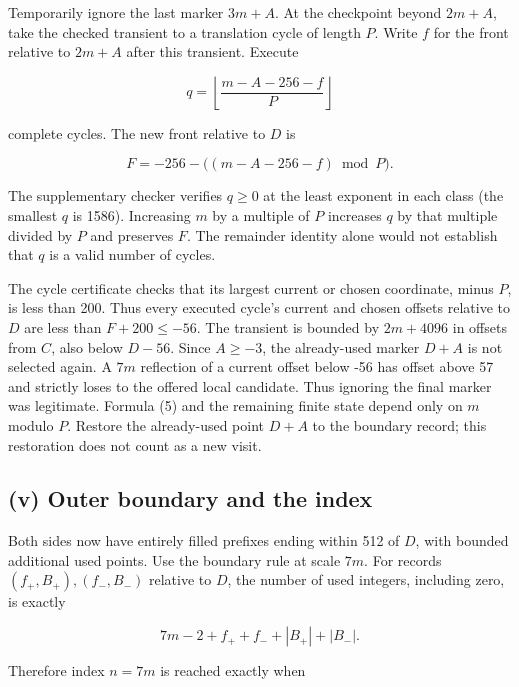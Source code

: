 \documentclass[11pt,a4paper]{article}
\begin{document}
Temporarily ignore the last marker $3m+A$. At the checkpoint beyond $2m+A$, take the checked transient to a translation cycle of length $P$. Write $f$ for the front relative to $2m+A$ after this transient. Execute

\begin{equation*}
q=\left\lfloor\frac{m-A-256-f}{P}\right\rfloor
\end{equation*}

complete cycles. The new front relative to $D$ is

\begin{equation*}
F=-256-\bigl((m-A-256-f)\bmod P\bigr). \tag{5}\label{eq:approach}
\end{equation*}

The supplementary checker verifies $q\ge0$ at the least exponent in each class (the smallest $q$ is 1586). Increasing $m$ by a multiple of $P$ increases $q$ by that multiple divided by $P$ and preserves $F$. The remainder identity alone would not establish that $q$ is a valid number of cycles.

The cycle certificate checks that its largest current or chosen coordinate, minus $P$, is less than 200. Thus every executed cycle's current and chosen offsets relative to $D$ are less than $F+200\le-56$. The transient is bounded by $2m+4096$ in offsets from $C$, also below $D-56$. Since $A\ge-3$, the already-used marker $D+A$ is not selected again. A $7m$ reflection of a current offset below -56 has offset above 57 and strictly loses to the offered local candidate. Thus ignoring the final marker was legitimate. Formula (5) and the remaining finite state depend only on $m$ modulo $P$. Restore the already-used point $D+A$ to the boundary record; this restoration does not count as a new visit.

\subsection*{(v) Outer boundary and the index}

Both sides now have entirely filled prefixes ending within 512 of $D$, with bounded additional used points. Use the boundary rule at scale $7m$. For records $(f_+,B_+),(f_-,B_-)$ relative to $D$, the number of used integers, including zero, is exactly

\begin{equation*}
7m-2+f_++f_-+|B_+|+|B_-|.
\end{equation*}

Therefore index $n=7m$ is reached exactly when
\end{document}
